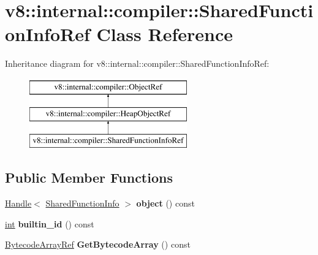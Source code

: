 \hypertarget{classv8_1_1internal_1_1compiler_1_1SharedFunctionInfoRef}{}\section{v8\+:\+:internal\+:\+:compiler\+:\+:Shared\+Function\+Info\+Ref Class Reference}
\label{classv8_1_1internal_1_1compiler_1_1SharedFunctionInfoRef}
Inheritance diagram for v8\+:\+:internal\+:\+:compiler\+:\+:Shared\+Function\+Info\+Ref\+:\begin{figure}[H]
\begin{center}
\leavevmode
\includegraphics[height=3.000000cm]{classv8_1_1internal_1_1compiler_1_1SharedFunctionInfoRef}
\end{center}
\end{figure}
\subsection*{Public Member Functions}
\begin{DoxyCompactItemize}
\item 
\mbox{\label{classv8_1_1internal_1_1compiler_1_1SharedFunctionInfoRef_a6d6daebe3414ffd411899e4a93a1c34e}} 
\mbox{\hyperlink{classv8_1_1internal_1_1Handle}{Handle}}$<$ \mbox{\hyperlink{classv8_1_1internal_1_1SharedFunctionInfo}{Shared\+Function\+Info}} $>$ {\bfseries object} () const
\item 
\mbox{\label{classv8_1_1internal_1_1compiler_1_1SharedFunctionInfoRef_a66f9a40e143ed31d55a0881399150b96}} 
\mbox{\hyperlink{classint}{int}} {\bfseries builtin\+\_\+id} () const
\item 
\mbox{\label{classv8_1_1internal_1_1compiler_1_1SharedFunctionInfoRef_acab2df31f50bde27dbaa60a7410b7f0b}} 
\mbox{\hyperlink{classv8_1_1internal_1_1compiler_1_1BytecodeArrayRef}{Bytecode\+Array\+Ref}} {\bfseries Get\+Bytecode\+Array} () const
\end{DoxyCompactItemize}
